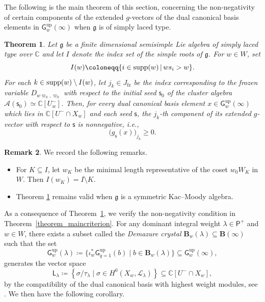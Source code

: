 \documentclass[11pt]{amsart}
\newcommand{\C}{\mathbb{C}}
\def\mcal{\mathcal}
\def\frak{\mathfrak}
\numberwithin{equation}{section}
\theoremstyle{plain}
\newtheorem{theorem}{Theorem}[section]
\theoremstyle{definition}
\newtheorem{remark}[theorem]{Remark}
\numberwithin{equation}{section}
\newcommand{\seed}{\mathsf{s}}
\begin{document}
The following is the main theorem of this section, concerning the non-negativity of certain  components of the extended $g$-vectors of the dual canonical basis elements in $\mathsf{G}^{\mathrm{up}}_w(\infty)$ when $\frak{g}$ is of simply laced type.

\begin{theorem}\label{theorem_main6}
Let $\mathfrak{g}$ be a finite dimensional semisimple Lie algebra of simply laced type over $\C$ and let $I$ denote the index set of the simple roots of $\mathfrak{g}$. 
For $w \in W$, set 
\begin{equation}\label{equ_defIw}
I(w) \coloneqq \{i\in {\rm supp}(w) \, \vert \, ws_i>w\}.
\end{equation}
For each $k \in {\rm supp}(w) \setminus I(w)$, let $j_{k} \in J_\mathrm{fz}$ be the index corresponding to the frozen variable $D_{w \varpi_k, \varpi_k}$ with respect to the initial seed $\seed_0$ of the cluster algebra $\mcal{A}(\seed_0) \simeq \C[U^-_w]$. Then, for every dual canonical basis element $x \in \mathsf{G}^{\mathrm{up}}_w(\infty)$ which lies in $\C[U^-\cap X_w]$ and each seed $\seed$, the $j_k$-th component of its extended $g$-vector with respect to $\seed$ is nonnegative, i.e.,
$$
\bigl( g_\seed (x) \bigr)_{j_k} \geq 0.
$$
\end{theorem}

\begin{remark} We record the following remarks.
\begin{itemize}
\item For $K \subseteq I$, let $w_K$ be the minimal length representative of the coset $w_0W_K$ in $W$. Then $I(w_K)= I \setminus K$. 
\item Theorem \ref{theorem_main6} remains valid when $\mathfrak{g}$ is a symmetric Kac--Moody algebra.
\end{itemize}
\end{remark}

As a consequence of Theorem~\ref{theorem_main6}, we verify the non-negativity condition in Theorem~\ref{theorem_maincriterion}. For any dominant integral weight $\lambda \in \mathsf{P}^+$ and $w \in W$, there exists a subset called the \emph{Demazure crystal} $\mathbf{B}_w(\lambda) \subseteq \textbf{B}(\infty)$ such that the set 
$$
\mathsf{G}^{\mathrm{up}}_w(\lambda) \coloneqq \bigl\{\iota_w^* \mathsf{G}^{\mathrm{up}}_{q=1}(b) \mid b \in \mathbf{B}_w(\lambda) \bigr\} \subseteq \mathsf{G}^{\mathrm{up}}_w(\infty),
$$
generates the vector space
\begin{equation}\label{equ_sigmatau}
\mathsf{L}_\lambda \coloneqq \left\{ \sigma/ \tau_\lambda \mid \sigma \in H^0(X_w, \mcal{L}_\lambda) \right\} \subseteq \C[U^-\cap X_w],
\end{equation}
by the compatibility of the dual canonical basis with highest weight modules, see \cite[Corollary 3.20]{FO17}. We then have the following corollary.
\end{document}
